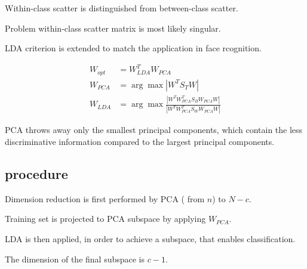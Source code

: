 Within-class scatter is distinguished from between-class scatter. 

Problem within-class scatter matrix is most likely singular.

LDA criterion is extended to match the application in face rcognition.


\begin{align}
  W_{opt}& = W^T_{LDA}W_{PCA}\\
  W_{PCA}& =\arg \max |W^T S_T W |\\
  W_{LDA}& =\arg \max \frac{|W^T W^T_{PCA} S_B W_{PCA}W |}{|W^T W^T_{PCA} S_W W_{PCA} W|}
\end{align}

PCA throws away only the smallest principal components, which contain the less discriminative information
compared to the largest principal components.

\subsection{procedure}
Dimension reduction is first performed by PCA ( from $n$) to $N-c$.

Training set is projected to PCA subspace by applying $W_{PCA}$.

LDA is then applied, in order to achieve a subspace, that enables classification.

The dimension of the final subspace is $c-1$.
